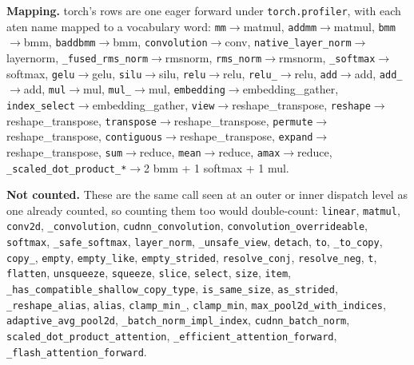 \begin{minipage}{\linewidth}\footnotesize
\par\smallskip
\textbf{Mapping.} torch's rows are one eager forward under \texttt{torch.profiler}, with each aten name mapped to a vocabulary word: \texttt{mm}$\rightarrow$matmul, \texttt{addmm}$\rightarrow$matmul, \texttt{bmm}$\rightarrow$bmm, \texttt{baddbmm}$\rightarrow$bmm, \texttt{convolution}$\rightarrow$conv, \texttt{native\_layer\_norm}$\rightarrow$layernorm, \texttt{\_fused\_rms\_norm}$\rightarrow$rmsnorm, \texttt{rms\_norm}$\rightarrow$rmsnorm, \texttt{\_softmax}$\rightarrow$softmax, \texttt{gelu}$\rightarrow$gelu, \texttt{silu}$\rightarrow$silu, \texttt{relu}$\rightarrow$relu, \texttt{relu\_}$\rightarrow$relu, \texttt{add}$\rightarrow$add, \texttt{add\_}$\rightarrow$add, \texttt{mul}$\rightarrow$mul, \texttt{mul\_}$\rightarrow$mul, \texttt{embedding}$\rightarrow$embedding\_gather, \texttt{index\_select}$\rightarrow$embedding\_gather, \texttt{view}$\rightarrow$reshape\_transpose, \texttt{reshape}$\rightarrow$reshape\_transpose, \texttt{transpose}$\rightarrow$reshape\_transpose, \texttt{permute}$\rightarrow$reshape\_transpose, \texttt{contiguous}$\rightarrow$reshape\_transpose, \texttt{expand}$\rightarrow$reshape\_transpose, \texttt{sum}$\rightarrow$reduce, \texttt{mean}$\rightarrow$reduce, \texttt{amax}$\rightarrow$reduce, \texttt{\_scaled\_dot\_product\_*}$\rightarrow$2 bmm + 1 softmax + 1 mul.
\par\smallskip
\textbf{Not counted.} These are the same call seen at an outer or inner dispatch level as one already counted, so counting them too would double-count: \texttt{linear}, \texttt{matmul}, \texttt{conv2d}, \texttt{\_convolution}, \texttt{cudnn\_convolution}, \texttt{convolution\_overrideable}, \texttt{softmax}, \texttt{\_safe\_softmax}, \texttt{layer\_norm}, \texttt{\_unsafe\_view}, \texttt{detach}, \texttt{to}, \texttt{\_to\_copy}, \texttt{copy\_}, \texttt{empty}, \texttt{empty\_like}, \texttt{empty\_strided}, \texttt{resolve\_conj}, \texttt{resolve\_neg}, \texttt{t}, \texttt{flatten}, \texttt{unsqueeze}, \texttt{squeeze}, \texttt{slice}, \texttt{select}, \texttt{size}, \texttt{item}, \texttt{\_has\_compatible\_shallow\_copy\_type}, \texttt{is\_same\_size}, \texttt{as\_strided}, \texttt{\_reshape\_alias}, \texttt{alias}, \texttt{clamp\_min\_}, \texttt{clamp\_min}, \texttt{max\_pool2d\_with\_indices}, \texttt{adaptive\_avg\_pool2d}, \texttt{\_batch\_norm\_impl\_index}, \texttt{cudnn\_batch\_norm}, \texttt{scaled\_dot\_product\_attention}, \texttt{\_efficient\_attention\_forward}, \texttt{\_flash\_attention\_forward}.

\end{minipage}
